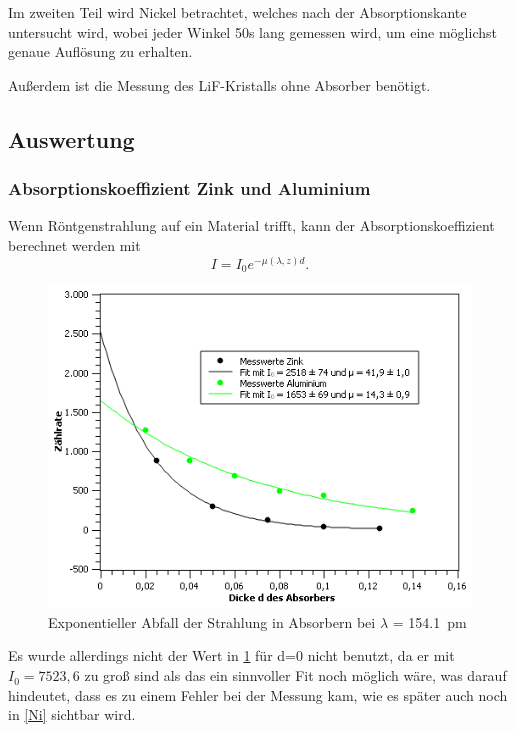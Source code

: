 \documentclass[
	a4paper,
	12pt,
	pagesize,
	ngerman
]{scrartcl}
\begin{document}
Im zweiten Teil wird Nickel betrachtet, welches nach der Absorptionskante untersucht wird, wobei jeder Winkel 50s lang gemessen wird, um eine möglichst genaue Auflösung zu erhalten.

Außerdem ist die Messung des LiF-Kristalls ohne Absorber benötigt.
\subsection{Auswertung}
\subsubsection{Absorptionskoeffizient Zink und Aluminium}

 Wenn Röntgenstrahlung auf ein Material trifft, kann der Absorptionskoeffizient berechnet werden mit
\begin{equation}
I = I_{0} e^{- \mu(\lambda,z) d}.
\label{Absorp}
\end{equation}

\begin{figure}[h!]
	\centering
	\includegraphics[scale = 1]{expo.png} 
	\caption{Exponentieller Abfall der Strahlung in Absorbern bei $\lambda$ = \SI{154,1}{pm}}
	\label{expo}
\end{figure}

Es wurde allerdings nicht der Wert in \cref{expo} für d=0 nicht benutzt, da er mit $I_{0} = 7523,6$ zu groß sind als das ein sinnvoller Fit noch möglich wäre, was darauf hindeutet, dass es zu einem Fehler bei der Messung kam, wie es später auch noch in \cref{Ni} sichtbar wird.
\end{document}
